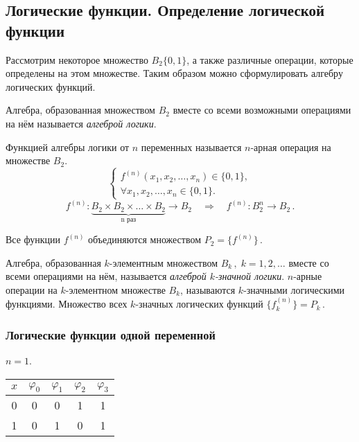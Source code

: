 \subsection{Логические функции. Определение логической функции}

Рассмотрим некоторое множество $B_2\{0,1\}$, а также различные
операции, которые определены на этом множестве. Таким образом можно
сформулировать алгебру логических функций.

Алгебра, образованная множеством $B_2$ вместе со всеми возможными
операциями на нём называется \emph{алгеброй логики}.

Функцией алгебры логики от $n$ переменных называется $n$-арная
операция на множестве $B_2$.
$$ \left\{
\begin{aligned} f^{(n)}(x_1,x_2,\ldots,x_n)\in\{0,1\},\\ \forall
x_1,x_2,\ldots,x_n \in\{0,1\}.
\end{aligned} \right.
$$
$$ f^{(n)}\colon \underbrace{B_2 \times B_2 \times \ldots \times
  B_2}_{\text{n раз}}\rightarrow B_2\quad\Rightarrow\quad
f^{(n)}\colon B_2^n\rightarrow B_2 \,.
$$

Все функции $f^{(n)}$ объединяются множеством $P_2=\{f^{(n)}\}\,$.

Алгебра, образованная $k$-элементным множеством $B_k\,,\;k=1,2,\ldots$
вместе со всеми операциями на нём, называется \emph{алгеброй
$k$-значной логики}. $n$-арные операции на $k$-элементном множестве
$B_k$, называются $k$-значными логическими функциями. Множество всех
$k$-значных логических функций $\{f_k^{(n)}\}=P_k\,$.

\subsubsection{Логические функции одной переменной}

$n=1$.

\begin{center}
  \begin{tabular}{c || c | c | c | c |} $x$ & $\varphi_0$ &
$\varphi_1$ & $\varphi_2$ & $\varphi_3$\\ \hline\hline 0 & 0 & 0 & 1 &
1\\ \hline 1 & 0 & 1 & 0 & 1\\ \hline
  \end{tabular}
\end{center}

